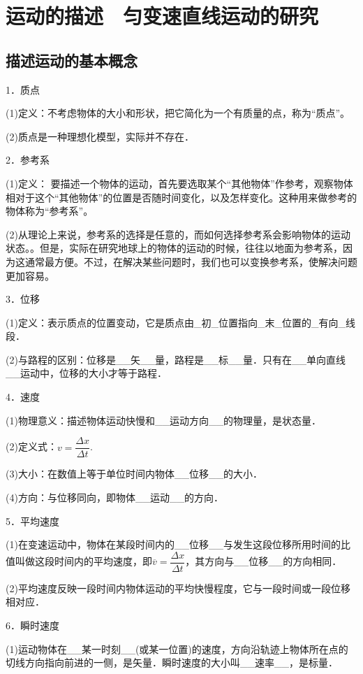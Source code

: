 \chapter{运动的描述　匀变速直线运动的研究}
\section{描述运动的基本概念}





1．质点

(1)定义：不考虑物体的大小和形状，把它简化为一个有质量的点，称为“质点”。

(2)质点是一种理想化模型，实际并不存在．

2．参考系

(1)定义： 要描述一个物体的运动，首先要选取某个“其他物体”作参考，观察物体相对于这个“其他物体”的位置是否随时间变化，以及怎样变化。这种用来做参考的物体称为“参考系”。

(2)从理论上来说，参考系的选择是任意的，而如何选择参考系会影响物体的运动状态。。但是，实际在研究地球上的物体的运动的时候，往往以地面为参考系，因为这通常最方便。不过，在解决某些问题时，我们也可以变换参考系，使解决问题更加容易。

3．位移

(1)定义：表示质点的位置变动，它是质点由\_初\_位置指向\_末\_位置的\_有向\_线段．

(2)与路程的区别：位移是\_\_矢\_\_量，路程是\_\_标\_\_量．只有在\_\_单向直线\_\_运动中，位移的大小才等于路程．

4．速度

(1)物理意义：描述物体运动快慢和\_\_运动方向\_\_的物理量，是状态量．

(2)定义式：$v=\dfrac{\Delta x}{\Delta t}$.

(3)大小：在数值上等于单位时间内物体\_\_位移\_\_的大小．

(4)方向：与位移同向，即物体\_\_运动\_\_的方向．

5．平均速度

(1)在变速运动中，物体在某段时间内的\_\_位移\_\_与发生这段位移所用时间的比值叫做这段时间内的平均速度，即$\overline{v}=\dfrac{\Delta x}{\Delta t}$，其方向与\_\_位移\_\_的方向相同．

(2)平均速度反映一段时间内物体运动的平均快慢程度，它与一段时间或一段位移相对应．

6．瞬时速度

(1)运动物体在\_\_某一时刻\_\_(或某一位置)的速度，方向沿轨迹上物体所在点的切线方向指向前进的一侧，是矢量．瞬时速度的大小叫\_\_速率\_\_，是标量．

